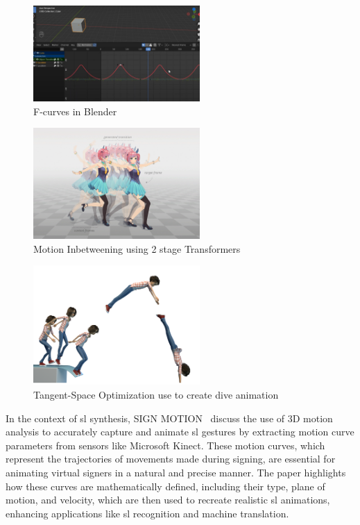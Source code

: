 \documentclass[../../main.tex]{subfiles}
\begin{document}
\begin{figure}
    \centering \includegraphics[width = 2.5in]{chapters/background_work/images/fcurves_blender.png}
    \caption{F-curves in Blender}
    \label{fig:fcurves_blender}
\end{figure}

\begin{figure}
    \centering \includegraphics[width = 2.5in]{chapters/background_work/images/inbetweening_transformers.jpg}
    \caption{Motion Inbetweening using 2 stage Transformers~\cite{10.1145/3306346.3322938}}
    \label{fig:inbetweening_transformers}
\end{figure}

\begin{figure}
    \centering \includegraphics[width = 2.5in]{chapters/background_work/images/inbetweening_disney.png}
    \caption{Tangent-Space Optimization use to create dive animation}
    \label{fig:inbetweening_disney}
\end{figure}

In the context of \gls{sl} synthesis, SIGN MOTION~\cite{inproceedings} discuss the use of 3D motion analysis to accurately capture and animate \gls{sl} gestures by extracting motion curve parameters from sensors like Microsoft Kinect. These motion curves, which represent the trajectories of movements made during signing, are essential for animating virtual signers in a natural and precise manner. The paper highlights how these curves are mathematically defined, including their type, plane of motion, and velocity, which are then used to recreate realistic \gls{sl} animations, enhancing applications like \gls{sl} recognition and machine translation.
\end{document}
